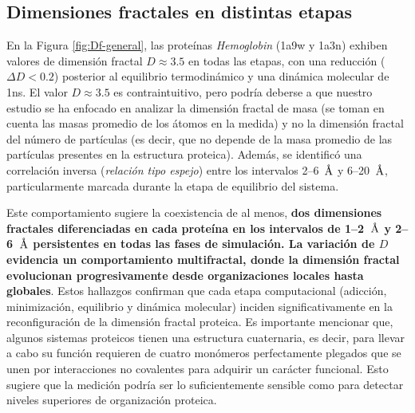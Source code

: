 	\subsection{Dimensiones fractales en distintas etapas}	
	\label{DFE}
	
	En la Figura \ref{fig:Df-general}, las prote\'{i}nas \textit{Hemoglobin} (1a9w y 1a3n) exhiben valores de dimensi\'{o}n fractal $D \approx 3.5$ en todas las etapas, con una reducci\'{o}n  ($\Delta D < 0.2$) posterior al equilibrio termodin\'{a}mico y una din\'{a}mica molecular de 1ns. El valor $D \approx 3.5$  es contraintuitivo, pero podr\'{i}a deberse a que nuestro estudio se ha enfocado en analizar la dimensi\'{o}n fractal de masa (se toman en cuenta las masas promedio de los \'{a}tomos en la medida) y no la dimensi\'{o}n fractal del n\'{u}mero de part\'{i}culas (es decir, que no depende de la masa promedio de las part\'{i}culas presentes en la estructura proteica). Adem\'{a}s, se identific\'{o} una correlaci\'{o}n inversa (\emph{relaci\'{o}n tipo espejo}) entre los intervalos 2--6~$\textup{\r{A}}$ y 6--20~$\textup{\r{A}}$, particularmente marcada durante la etapa de equilibrio del sistema. 
	
	Este comportamiento sugiere la coexistencia de al menos, \textbf{dos dimensiones fractales diferenciadas en cada prote\'{i}na en los intervalos de 1--2~$\textup{\r{A}}$ y 2--6~$\textup{\r{A}}$ persistentes en todas las fases de simulaci\'{o}n. La variaci\'{o}n de $D$ evidencia un comportamiento multifractal, donde la dimensi\'{o}n fractal evolucionan progresivamente desde organizaciones locales hasta globales}. Estos hallazgos confirman que cada etapa computacional (adicci\'{o}n, minimizaci\'{o}n, equilibrio y din\'{a}mica molecular) inciden significativamente en la reconfiguraci\'{o}n de la dimensi\'{o}n fractal proteica. Es importante mencionar que, algunos sistemas proteicos tienen una estructura cuaternaria, es decir, para llevar a cabo su funci\'{o}n requieren de cuatro mon\'{o}meros perfectamente plegados que se unen por interacciones no covalentes para adquirir un car\'{a}cter funcional. Esto sugiere que la medici\'{o}n podr\'{i}a ser lo suficientemente sensible como para detectar niveles superiores de organizaci\'{o}n proteica.
	

